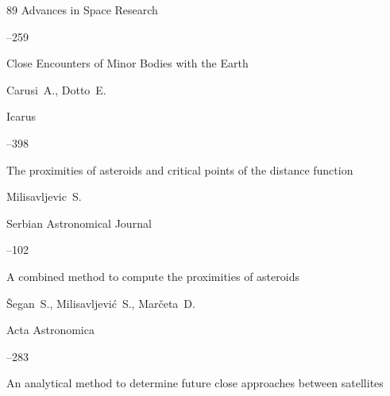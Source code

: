 \begin{thebibliography}{89}
\jour Advances in Space Research 




–259






\paper Close Encounters of Minor Bodies with the Earth

\by Carusi~A., Dotto~E.

\jour Icarus




–398






\paper The proximities of asteroids and critical points of the distance function

\by Milisavljevic~S.

\jour Serbian Astronomical Journal



–102






\paper A combined method to compute the proximities of asteroids

\by \v{S}egan~S., Milisavljevi\'c~S., Mar\v{c}eta~D.

\jour Acta Astronomica




–283





\paper An analytical method to determine future close approaches between satellites


\end{thebibliography}
